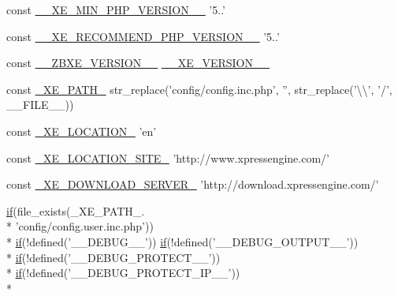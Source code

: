\begin{DoxyCompactItemize}
\item 
const \hyperlink{config_8inc_8php_a9efd2b40fddf6f5bdc89660de1492f93}{\-\_\-\-\_\-\-X\-E\-\_\-\-M\-I\-N\-\_\-\-P\-H\-P\-\_\-\-V\-E\-R\-S\-I\-O\-N\-\_\-\-\_\-} '5..'
\item 
const \hyperlink{config_8inc_8php_a46828ee09f5bc69de2b897e3b605e9d8}{\-\_\-\-\_\-\-X\-E\-\_\-\-R\-E\-C\-O\-M\-M\-E\-N\-D\-\_\-\-P\-H\-P\-\_\-\-V\-E\-R\-S\-I\-O\-N\-\_\-\-\_\-} '5..'
\item 
const \hyperlink{config_8inc_8php_a0e70c145bf3712e075af5c3861045dc9}{\-\_\-\-\_\-\-Z\-B\-X\-E\-\_\-\-V\-E\-R\-S\-I\-O\-N\-\_\-\-\_\-} \hyperlink{config_8inc_8php_afceaaec30d0e5b6a78d0ae28bcbfc8f3}{\-\_\-\-\_\-\-X\-E\-\_\-\-V\-E\-R\-S\-I\-O\-N\-\_\-\-\_\-}
\item 
const \hyperlink{config_8inc_8php_a5387c7a3f2aa38adf16f324cee88db88}{\-\_\-\-X\-E\-\_\-\-P\-A\-T\-H\-\_\-} str\-\_\-replace('config/config.\-inc.\-php', '', str\-\_\-replace('\textbackslash{}\textbackslash{}', '/', \-\_\-\-\_\-\-F\-I\-L\-E\-\_\-\-\_\-))
\item 
const \hyperlink{config_8inc_8php_a7330debbfb3a027cdd5f3d3dd1dfbdd0}{\-\_\-\-X\-E\-\_\-\-L\-O\-C\-A\-T\-I\-O\-N\-\_\-} 'en'
\item 
const \hyperlink{config_8inc_8php_a063bfd2eb9f811b1676d0dbc0cad2648}{\-\_\-\-X\-E\-\_\-\-L\-O\-C\-A\-T\-I\-O\-N\-\_\-\-S\-I\-T\-E\-\_\-} 'http\-://www.\-xpressengine.\-com/'
\item 
const \hyperlink{config_8inc_8php_a22df32d3e0eae0d60d6cddb9ec99d5ec}{\-\_\-\-X\-E\-\_\-\-D\-O\-W\-N\-L\-O\-A\-D\-\_\-\-S\-E\-R\-V\-E\-R\-\_\-} 'http\-://download.\-xpressengine.\-com/'
\item 
\hyperlink{config_8inc_8php_a95d67dac5da3e46d0b07e9ad1647d08a}{if}(file\-\_\-exists(\-\_\-\-X\-E\-\_\-\-P\-A\-T\-H\-\_\-. \\*
'config/config.\-user.\-inc.\-php')) \\*
\hyperlink{config_8inc_8php_a95d67dac5da3e46d0b07e9ad1647d08a}{if}(!defined('\-\_\-\-\_\-\-D\-E\-B\-U\-G\-\_\-\-\_\-')) \hyperlink{config_8inc_8php_a95d67dac5da3e46d0b07e9ad1647d08a}{if}(!defined('\-\_\-\-\_\-\-D\-E\-B\-U\-G\-\_\-\-O\-U\-T\-P\-U\-T\-\_\-\-\_\-')) \\*
\hyperlink{config_8inc_8php_a95d67dac5da3e46d0b07e9ad1647d08a}{if}(!defined('\-\_\-\-\_\-\-D\-E\-B\-U\-G\-\_\-\-P\-R\-O\-T\-E\-C\-T\-\_\-\-\_\-')) \\*
\hyperlink{config_8inc_8php_a95d67dac5da3e46d0b07e9ad1647d08a}{if}(!defined('\-\_\-\-\_\-\-D\-E\-B\-U\-G\-\_\-\-P\-R\-O\-T\-E\-C\-T\-\_\-\-I\-P\-\_\-\-\_\-')) \\*

\end{DoxyCompactItemize}
